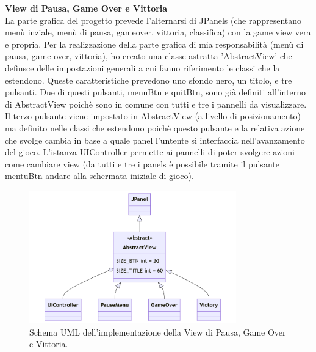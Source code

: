 \documentclass[a4paper,12pt]{report}
\begin{document}
\noindent
\textbf{View di Pausa, Game Over e Vittoria}\\
La parte grafica del progetto prevede l'alternarsi di JPanels (che rappresentano menù inziale, menù di pausa, gameover, vittoria, classifica)
con la game view vera e propria.
Per la realizzazione della parte grafica di mia responsabilità (menù di pausa, game-over, vittoria), ho creato una classe astratta 'AbstractView'
che definsce delle impostazioni generali a cui fanno riferimento le classi che la estendono.
Queste caratteristiche prevedono uno sfondo nero, un titolo, e tre pulsanti. Due di questi pulsanti, menuBtn e quitBtn,
sono già definiti all'interno di AbstractView poichè sono in comune con tutti e tre i pannelli da visualizzare.
Il terzo pulsante viene impostato in AbstractView (a livello di posizionamento) ma definito nelle classi che estendono poichè questo pulsante e la
relativa azione che svolge cambia in base a quale panel l'untente si interfaccia nell'avanzamento del gioco.
L'istanza UIController permette ai pannelli di poter svolgere azioni come cambiare view (da tutti e tre i panels è possibile tramite il pulsante
mentuBtn andare alla schermata iniziale di gioco).
\begin{figure}[H]
    \centering
    \includegraphics[width=0.8\textwidth]{images/AbstractView.png}
    \caption{Schema UML dell'implementazione della View di Pausa, Game Over e Vittoria.}
\end{figure}
\pagebreak
\end{document}
